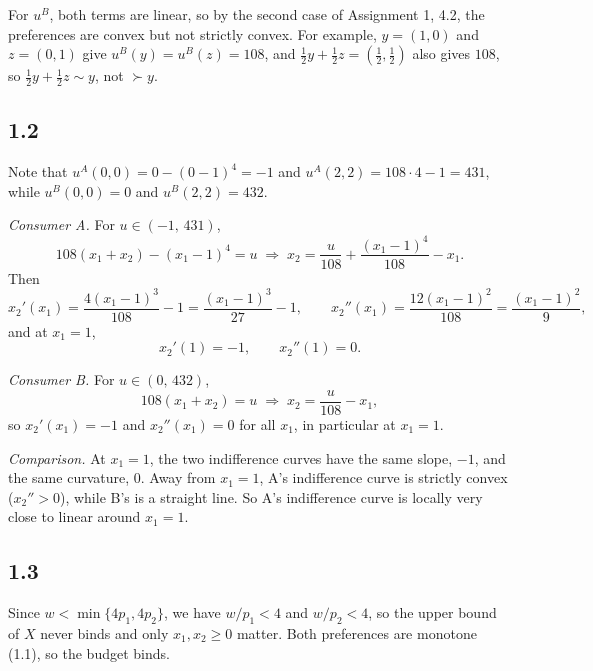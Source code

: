 \documentclass[12pt,letterpaper]{article}
\newif\ifshowhints
\newcommand{\hint}[1]{\ifshowhints{\color{blue}\small\textbf{Hint.} #1\par}\fi}
\begin{document}
For $u^B$, both terms are linear, so by the second case of Assignment 1, 4.2, the preferences are convex but not strictly convex. For example, $y=(1,0)$ and $z=(0,1)$ give $u^B(y)=u^B(z)=108$, and $\tfrac12 y+\tfrac12 z = (\tfrac12,\tfrac12)$ also gives $108$, so $\tfrac12 y+\tfrac12 z\sim y$, not $\succ y$.

\subsection*{1.2}

\hint{Set $u^i(x_1,x_2)=u$ and solve for $x_2$ as a function of $x_1$. Differentiate twice. At $x_1=1$, look at what happens to the term coming from $(x_1-1)^4$, and compare the slope and curvature of the two consumers' indifference curves there.}

Note that $u^A(0,0) = 0-(0-1)^4 = -1$ and $u^A(2,2) = 108\cdot 4 - 1 = 431$, while $u^B(0,0)=0$ and $u^B(2,2)=432$.

\textit{Consumer A.} For $u\in(-1,\,431)$,
\[
108(x_1+x_2) - (x_1-1)^4 = u \;\Longrightarrow\; x_2 = \frac{u}{108} + \frac{(x_1-1)^4}{108} - x_1 .
\]
Then
\[
x_2'(x_1) = \frac{4(x_1-1)^3}{108} - 1 = \frac{(x_1-1)^3}{27} - 1, \qquad x_2''(x_1) = \frac{12(x_1-1)^2}{108} = \frac{(x_1-1)^2}{9},
\]
and at $x_1=1$,
\[
x_2'(1) = -1, \qquad x_2''(1) = 0 .
\]

\textit{Consumer B.} For $u\in(0,\,432)$,
\[
108(x_1+x_2) = u \;\Longrightarrow\; x_2 = \frac{u}{108} - x_1,
\]
so $x_2'(x_1) = -1$ and $x_2''(x_1) = 0$ for all $x_1$, in particular at $x_1=1$.

\textit{Comparison.} At $x_1=1$, the two indifference curves have the same slope, $-1$, and the same curvature, $0$. Away from $x_1=1$, A's indifference curve is strictly convex ($x_2''>0$), while B's is a straight line. So A's indifference curve is locally very close to linear around $x_1=1$.

\subsection*{1.3}

\hint{The assumption $w<\min\{4p_1,4p_2\}$ means the upper bound $x_\ell\le 4$ never binds, so only the non-negativity corners matter. Consumer B has perfect substitutes: split into $p_1<p_2$, $p_1=p_2$, $p_1>p_2$. For consumer A, set $MRS=p_1/p_2$ and solve for $x_1$ (a cube root appears), then check when $x_1\in[0,w/p_1]$ and handle the corners.}

Since $w<\min\{4p_1,4p_2\}$, we have $w/p_1<4$ and $w/p_2<4$, so the upper bound of $X$ never binds and only $x_1,x_2\ge 0$ matter. Both preferences are monotone (1.1), so the budget binds.
\end{document}
